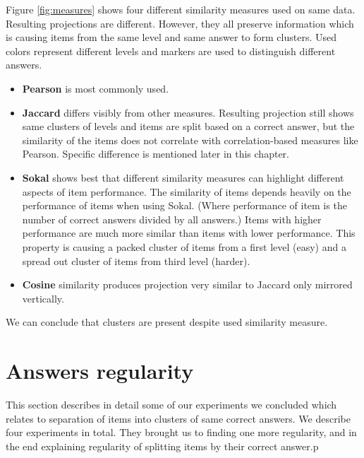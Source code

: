 \documentclass[
  digital, %
  table,   %
  nolof,     %
  nolot,     %
  nocover,
  color,
  final, %
]{fithesis3}
\begin{document}

Figure \ref{fig:measures} shows four different similarity measures used on same data. Resulting projections are different. However, they all preserve information which is causing items from the same level and same answer to form clusters. Used colors represent different levels and markers are used to distinguish different answers.


\begin{itemize}
\item
  \textbf{Pearson} is most commonly used.

\item
  \textbf{Jaccard} differs visibly from other measures. Resulting projection still shows same clusters of levels and items are split based on a correct answer, but the similarity of the items does not correlate with correlation-based measures like Pearson. Specific difference is mentioned later in this chapter.

\item
  \textbf{Sokal} shows best that different similarity measures can highlight different aspects of item performance. The similarity of items depends heavily on the performance of items when using Sokal. (Where performance of item is the number of correct answers divided by all answers.) Items with higher performance are much more similar than items with lower performance. This property is causing a packed cluster of items from a first level (easy) and a spread out cluster of items from third level (harder).

\item
  \textbf{Cosine} similarity produces projection very similar to Jaccard only mirrored vertically.
\end{itemize}

We can conclude that clusters are present despite used similarity measure.


\section{Answers regularity}\label{evaulation-answers-regularity}

This section describes in detail some of our experiments we concluded which relates to separation of items into clusters of same correct answers. We describe four experiments in total. They brought us to finding one more regularity, and in the end explaining regularity of splitting items by their correct answer.p
\end{document}
